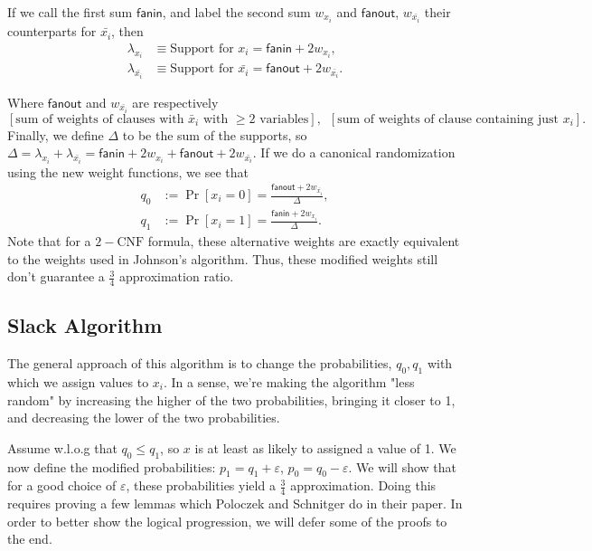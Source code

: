 \documentclass[11pt,letter]{article}
\numberwithin{theorem}{section}
\begin{document}
If we call the first sum $\mathsf{fanin}$, and label the second sum $w_{x_i}$ and $\mathsf{fanout}$, $w_{\bar{x_i}}$ their counterparts for $\bar{x_i}$, then
\begin{align*}
\lambda_{x_i} &\equiv \textrm{Support for } x_i = \mathsf{fanin} + 2w_{x_i}, \\
\lambda_{\bar{x_i}} &\equiv \textrm{Support for } \bar{x_i} = \mathsf{fanout} + 2w_{\bar{x_i}}.
\end{align*}

Where $\mathsf{fanout}$ and $w_{\bar{x_i}}$ are respectively \[[\textrm{sum of weights of clauses with }\bar{x}_i\textrm{ with }\ge 2\textrm{ variables}] ,\,\,\, [\textrm{sum of weights of clause containing just }x_i].\]
Finally, we define $\Delta$ to be the sum of the supports, so $\Delta = \lambda_{x_i} + \lambda_{\bar{x_i}} = \mathsf{fanin} + 2w_{x_i} + \mathsf{fanout} + 2w_{\bar{x_i}}$. If we do a canonical randomization using the new weight functions, we see that
\begin{align*}
q_0 &:= \Pr[x_i=0] = \frac{\mathsf{fanout} + 2w_{\bar{x_i}}}{\Delta}, \\
q_1 &:= \Pr[x_i=1] = \frac{\mathsf{fanin} + 2w_{x_i}}{\Delta}.
\end{align*}
Note that for a $2-\text{CNF}$ formula, these alternative weights are exactly equivalent to the weights used in Johnson's algorithm. Thus, these modified weights still don't guarantee a $\frac{3}{4}$ approximation ratio.

\subsection*{Slack Algorithm}
The general approach of this algorithm is to change the probabilities, $q_0, q_1$ with which we assign values to $x_i$. In a sense, we're making the algorithm "less random" by increasing the higher of the two probabilities, bringing it closer to 1, and decreasing the lower of the two probabilities.

Assume w.l.o.g that $q_0 \le q_1$, so $x$ is at least as likely to assigned a value of 1. We now define the modified probabilities: $p_1 = q_1 + \varepsilon$, $p_0 = q_0 - \varepsilon$. We will show that for a good choice of $\varepsilon$, these probabilities yield a $\frac{3}{4}$ approximation. Doing this requires proving a few lemmas which Poloczek and Schnitger do in their paper. In order to better show the logical progression, we will defer some of the proofs to the end.
\end{document}
